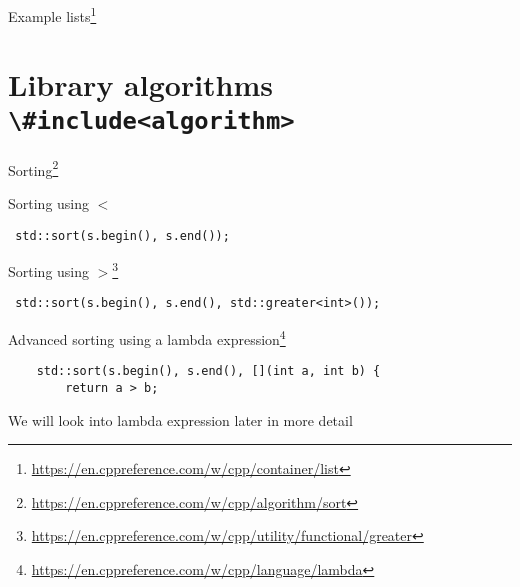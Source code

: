 \documentclass[12pt,t]{beamer}
\begin{document}
\begin{frame}{Example lists\footnote{\tiny\url{https://en.cppreference.com/w/cpp/container/list}}}



\end{frame}

\section{Library algorithms \lstinline|\#include<algorithm>|}


\begin{frame}[fragile]{Sorting\footnote{\tiny\url{https://en.cppreference.com/w/cpp/algorithm/sort}}}

\begin{block}{Sorting using $<$}
\begin{lstlisting}
 std::sort(s.begin(), s.end());
\end{lstlisting}
\end{block}

\begin{block}{Sorting using $>$\footnote{\tiny\url{https://en.cppreference.com/w/cpp/utility/functional/greater}}}
\begin{lstlisting}
 std::sort(s.begin(), s.end(), std::greater<int>());
\end{lstlisting}
\end{block}

\begin{block}{Advanced sorting using a lambda expression\footnote{\tiny\url{https://en.cppreference.com/w/cpp/language/lambda}} }
\begin{lstlisting}
    std::sort(s.begin(), s.end(), [](int a, int b) {
        return a > b; 
\end{lstlisting}
\end{block}
We will look into lambda expression later in more detail

\end{frame}
\end{document}
